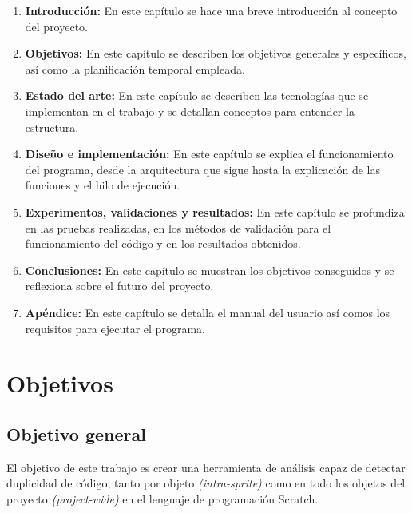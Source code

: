 \documentclass[a4paper, 12pt]{book}
\begin{document}
\begin{enumerate}
  	\item \textbf{Introducción:} En este capítulo se hace una breve introducción al concepto del proyecto. 
  	\item \textbf{Objetivos:} En este capítulo se describen los objetivos generales y específicos, así como la planificación temporal empleada.
  	\item \textbf{Estado del arte:} En este capítulo se describen las tecnologías que se implementan en el trabajo y se detallan conceptos para entender la estructura.
  	\item \textbf{Diseño e implementación:} En este capítulo se explica el funcionamiento del programa, desde la arquitectura que sigue hasta la explicación de las funciones y el hilo de ejecución.
  	\item \textbf{Experimentos, validaciones y resultados:} En este capítulo se profundiza en las pruebas realizadas, en los métodos de validación para el funcionamiento del código y en los resultados obtenidos.
  	\item \textbf{Conclusiones:} En este capítulo se muestran los objetivos conseguidos y se reflexiona sobre el futuro del proyecto.
  	\item \textbf{Apéndice:} En este capítulo se detalla el manual del usuario así comos los requisitos para ejecutar el programa.  
\end{enumerate}


\cleardoublepage %
\chapter{Objetivos} %
\label{chap:objetivos} %

\section{Objetivo general} %
\label{sec:objetivo-general} %

El objetivo de este trabajo es crear una herramienta de análisis capaz de detectar duplicidad de código, tanto por objeto \textit{(intra-sprite)} como en todo los objetos del proyecto \textit{(project-wide)} en el lenguaje de programación Scratch.
\end{document}

